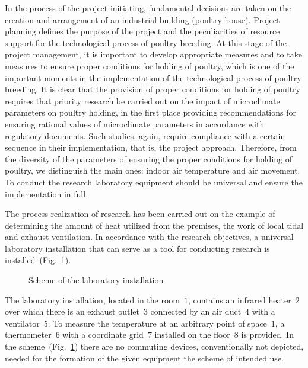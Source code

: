 \documentclass[12pt,twoside]{article}
\newcommand{\FigRef}[2][]{(Fig.~\ref{#2}\textit{#1})}
\begin{document}
\begin{JGGarticle}
			In the process of the project initiating, fundamental decisions are taken on the creation and arrangement of an industrial building (poultry house). Project planning defines the purpose of the project and the peculiarities of resource support for the technological process of poultry breeding. At this stage of the project management, it is important to develop appropriate measures and to take measures to ensure proper conditions for holding of poultry, which is one of the important moments in the implementation of the technological process of poultry breeding. It is clear that the provision of proper conditions for holding of poultry requires that priority research be carried out on the impact of microclimate parameters on poultry holding, in the first place providing recommendations for ensuring rational values of microclimate parameters in accordance with regulatory documents. Such studies, again, require compliance with a certain sequence in their implementation, that is, the project approach. Therefore, from the diversity of the parameters of ensuring the proper conditions for holding of poultry, we distinguish the main ones: indoor air temperature and air movement. To conduct the research laboratory equipment should be universal and ensure the implementation in full.
			
			The process realization of research has been carried out on the example of determining the amount of heat utilized from the premises, the work of local tidal and exhaust ventilation. In accordance with the research objectives, a universal laboratory installation that can serve as a tool for conducting research is installed~\FigRef{fig:labinst}.
			\begin{figure}[!hbt]
				\caption{Scheme of the laboratory installation}
				\label{fig:labinst}
			\end{figure}
		
			The laboratory installation, located in the room~$1$, contains an infrared heater~$2$ over which there is an exhaust outlet~$3$ connected by an air duct~$4$ with a ventilator~$5$. To measure the temperature at an arbitrary point of space~$1$, a thermometer~$6$ with a coordinate grid~$7$ installed on the floor~$8$ is provided. In the scheme~\FigRef{fig:labinst} there are no commuting devices, conventionally not depicted, needed for the formation of the given equipment the scheme of intended use.
			

\end{JGGarticle}
\end{document}
